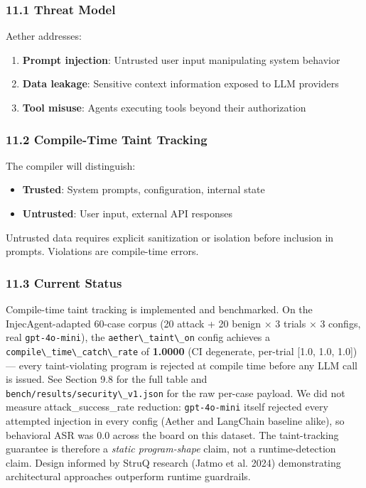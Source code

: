 \documentclass[
]{article}
\newcommand{\passthrough}[1]{#1}
\providecommand{\tightlist}{%
  \setlength{\itemsep}{0pt}\setlength{\parskip}{0pt}}
\begin{document}
\subsubsection{11.1 Threat Model}\label{threat-model}

Aether addresses:

\begin{enumerate}
\def\labelenumi{\arabic{enumi}.}
\tightlist
\item
  \textbf{Prompt injection}: Untrusted user input manipulating system
  behavior
\item
  \textbf{Data leakage}: Sensitive context information exposed to LLM
  providers
\item
  \textbf{Tool misuse}: Agents executing tools beyond their
  authorization
\end{enumerate}

\subsubsection{11.2 Compile-Time Taint
Tracking}\label{compile-time-taint-tracking}

The compiler will distinguish:

\begin{itemize}
\tightlist
\item
  \textbf{Trusted}: System prompts, configuration, internal state
\item
  \textbf{Untrusted}: User input, external API responses
\end{itemize}

Untrusted data requires explicit sanitization or isolation before
inclusion in prompts. Violations are compile-time errors.

\subsubsection{11.3 Current Status}\label{current-status-1}

Compile-time taint tracking is implemented and benchmarked. On the
InjecAgent-adapted 60-case corpus (20 attack + 20 benign × 3 trials × 3
configs, real \passthrough{\lstinline!gpt-4o-mini!}), the
\passthrough{\lstinline!aether\_taint\_on!} config achieves a
\passthrough{\lstinline!compile\_time\_catch\_rate!} of \textbf{1.0000}
(CI degenerate, per-trial {[}1.0, 1.0, 1.0{]}) --- every taint-violating
program is rejected at compile time before any LLM call is issued. See
Section 9.8 for the full table and
\passthrough{\lstinline!bench/results/security\_v1.json!} for the raw
per-case payload. We did not measure attack\_success\_rate reduction:
\passthrough{\lstinline!gpt-4o-mini!} itself rejected every attempted
injection in every config (Aether and LangChain baseline alike), so
behavioral ASR was 0.0 across the board on this dataset. The
taint-tracking guarantee is therefore a \emph{static program-shape}
claim, not a runtime-detection claim. Design informed by StruQ research
({Jatmo et al.} 2024) demonstrating architectural approaches outperform
runtime guardrails.
\end{document}
